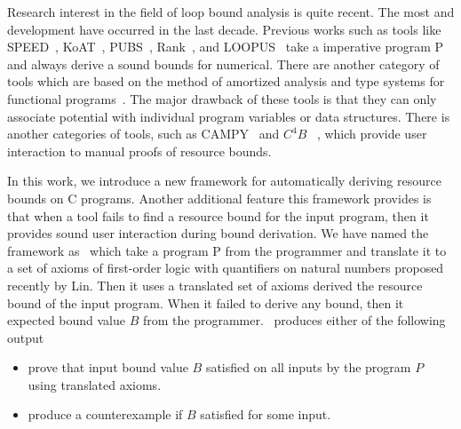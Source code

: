 Research interest in the field of loop bound analysis is quite recent. The most and development have occurred in the last decade. Previous works such as tools like SPEED~\cite{speed1}, KoAT~\cite{Brockschmidt:2016:ARS:2982214.2866575}, PUBS~\cite{Albert:2012:CAO:2076807.2077025}, Rank~\cite{Alias:2010:MRP:1882094.1882102}, and LOOPUS~\cite{10.1007/978-3-319-08867-9_50} take a
imperative program P and always derive a sound bounds for numerical. 
There are another category of tools which are based on the method
of amortized analysis and type systems for functional programs~\cite{Hoffmann:2012:MAR:2362389.2362393,Hofmann:2003:SPH:604131.604148,Hofmann:2006:TAH:2182132.2182135}. The major drawback of these tools is that they
can only associate potential with individual program variables or data structures. There is another categories of tools, such as CAMPY~\cite{Srikanth:2017:CVU:3009837.3009864} and $C^{4}B$~\cite{Carbonneaux:2015:CCR:2737924.2737955} , which provide user interaction to manual proofs of resource bounds. 

In this work, we introduce a new framework for automatically deriving resource bounds on C programs. Another additional feature this framework provides is that when a tool fails to find a resource bound for the input program, then it provides sound user interaction during bound derivation. We have named the framework as \SystemName\ which take a program P from the programmer and translate it to a set of axioms of first-order logic with quantifiers on natural numbers proposed recently by Lin. Then it uses a translated set of axioms derived the resource bound of the input program. When it failed to derive any bound, then it expected bound value $B$ from the programmer. \SystemName\ produces either  of the following output
\begin{itemize}
	\item prove that input bound value $B$ satisfied on all inputs by the program $P$ using translated axioms.
	\item produce a counterexample if $B$ satisfied for some input.
\end{itemize}


